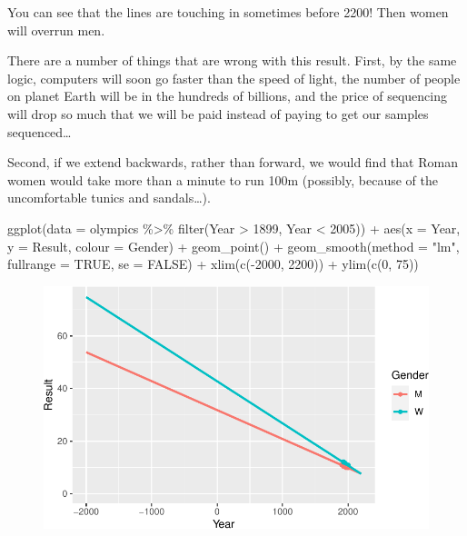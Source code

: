 \documentclass[
  letterpaper,
  DIV=11,
  numbers=noendperiod]{scrreprt}
\newenvironment{Shaded}{\begin{snugshade}}{\end{snugshade}}
\newcommand{\AttributeTok}[1]{\textcolor[rgb]{0.40,0.45,0.13}{#1}}
\newcommand{\ConstantTok}[1]{\textcolor[rgb]{0.56,0.35,0.01}{#1}}
\newcommand{\DecValTok}[1]{\textcolor[rgb]{0.68,0.00,0.00}{#1}}
\newcommand{\FunctionTok}[1]{\textcolor[rgb]{0.28,0.35,0.67}{#1}}
\newcommand{\NormalTok}[1]{\textcolor[rgb]{0.00,0.23,0.31}{#1}}
\newcommand{\SpecialCharTok}[1]{\textcolor[rgb]{0.37,0.37,0.37}{#1}}
\newcommand{\StringTok}[1]{\textcolor[rgb]{0.13,0.47,0.30}{#1}}
\begin{document}
You can see that the lines are touching in sometimes before 2200! Then
women will overrun men.

There are a number of things that are wrong with this result. First, by
the same logic, computers will soon go faster than the speed of light,
the number of people on planet Earth will be in the hundreds of
billions, and the price of sequencing will drop so much that we will be
paid instead of paying to get our samples sequenced\ldots{}

Second, if we extend backwards, rather than forward, we would find that
Roman women would take more than a minute to run 100m (possibly, because
of the uncomfortable tunics and sandals\ldots).

\begin{Shaded}
\begin{Highlighting}[]
\FunctionTok{ggplot}\NormalTok{(}\AttributeTok{data =}\NormalTok{ olympics }\SpecialCharTok{\%\textgreater{}\%} \FunctionTok{filter}\NormalTok{(Year }\SpecialCharTok{\textgreater{}} \DecValTok{1899}\NormalTok{, Year }\SpecialCharTok{\textless{}} \DecValTok{2005}\NormalTok{)) }\SpecialCharTok{+} 
  \FunctionTok{aes}\NormalTok{(}\AttributeTok{x =}\NormalTok{ Year, }\AttributeTok{y =}\NormalTok{ Result, }\AttributeTok{colour =}\NormalTok{ Gender) }\SpecialCharTok{+} 
  \FunctionTok{geom\_point}\NormalTok{() }\SpecialCharTok{+} \FunctionTok{geom\_smooth}\NormalTok{(}\AttributeTok{method =} \StringTok{"lm"}\NormalTok{, }\AttributeTok{fullrange =} \ConstantTok{TRUE}\NormalTok{, }\AttributeTok{se =} \ConstantTok{FALSE}\NormalTok{) }\SpecialCharTok{+}
  \FunctionTok{xlim}\NormalTok{(}\FunctionTok{c}\NormalTok{(}\SpecialCharTok{{-}}\DecValTok{2000}\NormalTok{, }\DecValTok{2200}\NormalTok{)) }\SpecialCharTok{+} \FunctionTok{ylim}\NormalTok{(}\FunctionTok{c}\NormalTok{(}\DecValTok{0}\NormalTok{, }\DecValTok{75}\NormalTok{))}
\end{Highlighting}
\end{Shaded}

\begin{figure}[H]

{\centering \includegraphics{./08-linearreg_files/figure-pdf/unnamed-chunk-20-1.pdf}

}

\end{figure}
\end{document}
